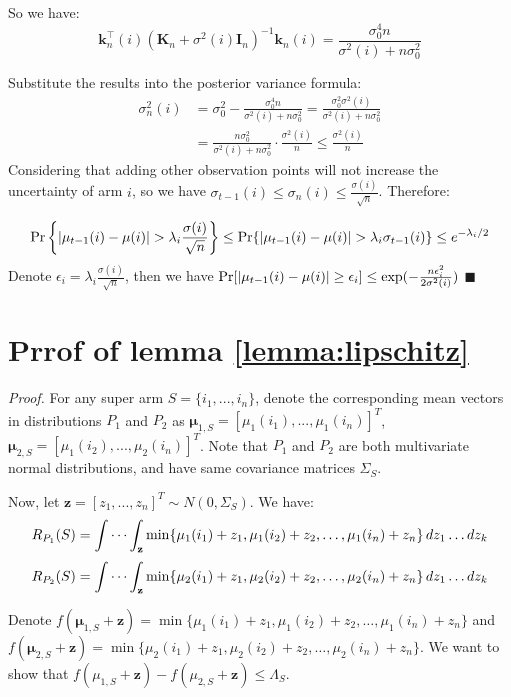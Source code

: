 \documentclass[opre,sglanonrev]{informs4}
\begin{document}
So we have:
\[
\mathbf{k}_n^\top(i)(\mathbf{K}_n + \sigma^2(i)\mathbf{I}_n)^{-1}\mathbf{k}_n(i) = \frac{\sigma_0^4n}{\sigma^2(i) + n\sigma_0^2}
\]

Substitute the results into the posterior variance formula:
\begin{equation*}
\begin{aligned}
\sigma_n^2(i) &= \sigma_0^2 - \frac{\sigma_0^4n}{\sigma^2(i) + n\sigma_0^2} = \frac{\sigma_0^2\sigma^2(i)}{\sigma^2(i) + n\sigma_0^2} \\
&= \frac{n\sigma_0^2}{\sigma^2(i)+n\sigma_0^2}\cdot \frac{\sigma^2(i)}{n} \leq \frac{\sigma^2(i)}{n}
\end{aligned}
\end{equation*} 
Considering that adding other observation points will not increase the uncertainty of arm $i$, so we have $\sigma_{t-1}(i) \leq \sigma_n(i) \leq \frac{\sigma(i)}{\sqrt{n}}$. Therefore:

$$\textnormal{Pr}\left\{|\mu_{t-1}(i)-\mu(i)|>\lambda_i \frac{\sigma(i)}{\sqrt{n}}\right\}\leq\textnormal{Pr}\{|\mu_{t-1}(i)-\mu(i)|>\lambda_i \sigma_{t-1}(i)\}\leq e^{-\lambda_i/2}$$
Denote $\epsilon_i = \lambda_i \frac{\sigma(i)}{\sqrt{n}}$, then we have $\textnormal{Pr}[|\mu_{t-1}(i)-\mu(i)|\geq \epsilon_i]\leq \exp(-\frac{n\epsilon_i^2}{2\sigma^2(i)})$  \hfill $\blacksquare$

\section{Prrof of lemma \ref{lemma:lipschitz}}
\textit{Proof.} For any super arm $S = \{i_1,...,i_n\}$, denote the corresponding mean vectors in distributions $P_1$ and $P_2$ as $\boldsymbol{\mu}_{1,S} = [\mu_1(i_1),...,\mu_1(i_n)]^T$, $\boldsymbol{\mu}_{2,S} = [\mu_1(i_2),...,\mu_2(i_n)]^T$. Note that $P_1$ and $P_2$ are both multivariate normal distributions, and have same covariance matrices $\Sigma_S$.

Now, let $\mathbf{z} = [z_1,...,z_n]^T \sim N(0,\Sigma_S)$. We have:
$$
R_{P_1}(S) = \idotsint_\mathbf{z} \min \{\mu_1(i_1)+z_1,\mu_1(i_2)+z_2, \dots ,\mu_1(i_n)+z_n\} \,dz_1 \dots dz_k
$$
$$
R_{P_2}(S) = \idotsint_\mathbf{z} \min \{\mu_2(i_1)+z_1,\mu_2(i_2)+z_2, \dots ,\mu_2(i_n)+z_n\} \,dz_1 \dots dz_k
$$

Denote $f(\boldsymbol{\mu}_{1,S}+\mathbf{z}) = \min \{\mu_1(i_1)+z_1,\mu_1(i_2)+z_2, \dots ,\mu_1(i_n)+z_n\}$ and $f(\boldsymbol{\mu}_{2,S}+\mathbf{z}) = \min \{\mu_2(i_1)+z_1,\mu_2(i_2)+z_2, \dots ,\mu_2(i_n)+z_n\}$. We want to show that $f(\mu_{1,S}+\mathbf{z})-f(\mu_{2,S}+\mathbf{z})\leq \Lambda_S$.
\end{document}
